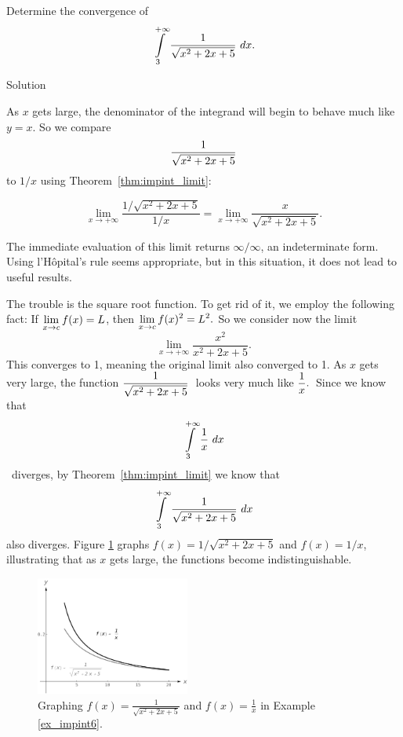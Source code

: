 \begin{example}\label{ex_impint6}
Determine the convergence of 
$$\displaystyle \int\limits_3^{+\infty} \frac{1}{\sqrt{x^2+2x+5}}\ dx.$$

Solution 

As $x$ gets large, the denominator of the integrand will begin to behave much like $y=x$. So we compare 
$$\displaystyle\frac{1}{\sqrt{x^2+2x+5}}$$ to $1/x$ using Theorem~\ref{thm:impint_limit}:

$$
\lim_{x\to+\infty} \frac{1/\sqrt{x^2+2x+5}}{1/x} = \lim_{x\to+\infty}\frac{x}{\sqrt{x^2+2x+5}}.$$

The immediate evaluation of this limit returns $\infty/\infty$, an indeterminate form. Using l'H\^opital's rule seems appropriate, but in this situation, it does not lead to useful results. 

The trouble is the square root function. To get rid of it, we employ the following fact: If $\displaystyle \lim_{x\to c} f(x) = L$, then $\displaystyle\lim_{x\to c} f(x)^2 = L^2.$  So we consider now the limit
$$\lim_{x\to+\infty} \frac{x^2}{x^2+2x+5}.$$ This converges to 1, meaning the original limit also converged to 1. As $x$ gets very large, the function 
\small$\displaystyle\frac{1}{\sqrt{x^2+2x+5}}$\normalsize\ looks very much like \small$\displaystyle\frac1x.$\normalsize\ 
Since we know that 
$$\ds \int\limits_3^{+\infty} \frac1x\ dx$$\normalsize\ diverges, by Theorem~\ref{thm:impint_limit} we know that 
$$\displaystyle \int\limits_3^{+\infty}\frac{1}{\sqrt{x^2+2x+5}}\ dx$$
\normalsize also diverges. Figure \ref{fig_int_19} graphs $f(x)=1/\sqrt{x^2+2x+5}$ and $f(x)=1/x$, illustrating that as $x$ gets large, the functions become indistinguishable.

\begin{figure}[H]
	\begin{center}
			\includegraphics[width=0.45\textwidth]{fig_int_19}
	\caption{Graphing $f(x)=\frac{1}{\sqrt{x^2+2x+5}}$ and $f(x)=\frac1x$ in Example \ref{ex_impint6}.}
	\label{fig_int_19}
	\end{center}
\end{figure}


\end{example}

